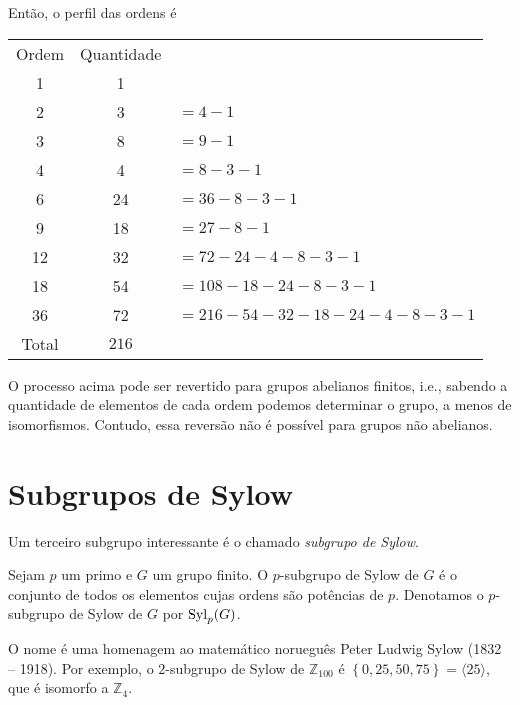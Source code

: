     	\par\vspace{0.3cm} Então, o perfil das ordens é
    	\begin{center}
    		\begin{tabular}{|c|c|l}
    			\cline{1-2}
    			Ordem & Quantidade & \\
    			\cline{1-2}
    			1 & 1 & \\
    			\cline{1-2}
    			2 & 3 & $= 4 - 1$\\
    			\cline{1-2}
    			3 & 8 & $= 9 - 1$\\
    			\cline{1-2}
    			4 & 4 & $= 8 - 3 - 1$\\
    			\cline{1-2}
    			6 & 24 & $= 36 - 8 - 3 - 1$\\
    			\cline{1-2}
    			9 & 18 & $= 27 - 8 - 1$\\
    			\cline{1-2}
    			12 & 32 & $= 72 - 24 - 4 - 8 - 3 - 1$\\
    			\cline{1-2}
    			18 & 54 & $= 108 - 18 - 24 - 8 - 3 - 1$\\
    			\cline{1-2}
    			36 & 72 & $= 216 - 54 - 32 - 18 - 24 - 4 - 8 - 3 - 1$ \\
    			\cline{1-2}
    			Total & $216$ &  \\
    			\cline{1-2}
    		\end{tabular}
    	\end{center}
    	O processo acima pode ser revertido para grupos abelianos finitos, i.e., 
    	sabendo a quantidade de elementos de cada ordem podemos determinar o grupo, a menos de isomorfismos.
    	Contudo, essa reversão não é possível para grupos não abelianos.
	\section{Subgrupos de Sylow} 
    	Um terceiro subgrupo interessante é o chamado \textit{subgrupo de Sylow}.
    	\begin{definition}
    	\label{def subgrupo de Sylow}
    		Sejam $p$ um primo e $G$ um grupo finito. O $p$-subgrupo de Sylow de $G$ é o conjunto de todos 
    		os elementos cujas ordens são potências de $p$. Denotamos o $p$-subgrupo de Sylow de $G$ por
    		$\operatorname{Syl}_p(G)$.
    	\end{definition}
    	O nome é uma homenagem ao matemático norueguês Peter Ludwig Sylow (1832 -- 1918). 
    	Por exemplo, o $2$-subgrupo de Sylow de $\mathbb{Z}_{100}$	é 
    	$\left\{ 0, 25, 50, 75 \right\} = \langle 25 \rangle$, que é isomorfo a $\mathbb{Z}_4$.
    	
